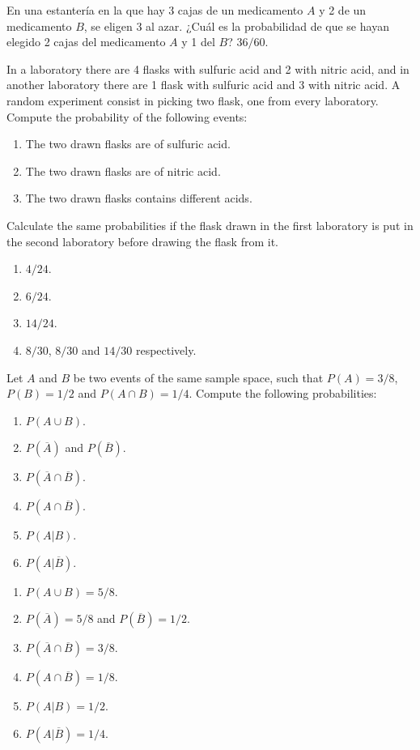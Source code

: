 
{En una estantería en la que hay 3 cajas de un medicamento $A$ y 2 de un medicamento $B$, se eligen 3 al azar.
¿Cuál es la probabilidad de que se hayan elegido 2 cajas del medicamento $A$ y 1 del $B$?
}
{$36/60$.}
{}


{In a laboratory there are 4 flasks with sulfuric acid and 2 with nitric acid, and in another laboratory there are 1 flask with sulfuric acid and 3 with nitric acid. 
A random experiment consist in picking two flask, one from every laboratory. 
Compute the probability of the following events:

\begin{enumerate}
\item The two drawn flasks are of sulfuric acid.
\item The two drawn flasks are of nitric acid.
\item The two drawn flasks contains different acids.
\end{enumerate}
Calculate the same probabilities if the flask drawn in the first laboratory is put in the second laboratory before drawing the flask from it. 
}
{
\begin{enumerate}
\item $4/24$.
\item $6/24$.
\item $14/24$.
\item $8/30$, $8/30$ and $14/30$ respectively. 
\end{enumerate}
}
{}


{Let $A$ and $B$ be two events of the same sample space, such that $P(A)=3/8$, $P(B)=1/2$ and $P(A\cap B)=1/4$.
Compute the following probabilities:

\begin{enumerate}
\item  $P(A\cup B)$.
\item  $P(\overline{A})$ and $P(\overline{B})$.
\item  $P(\overline{A}\cap \overline{B})$.
\item  $P(A\cap \overline{B})$.
\item  $P(A|B)$.
\item  $P(A|\overline{B})$.
\end{enumerate}
}
{
\begin{enumerate}
\item  $P(A\cup B)=5/8$.
\item  $P(\overline{A})=5/8$ and $P(\overline{B})=1/2$.
\item  $P(\overline{A}\cap \overline{B})=3/8$.
\item  $P(A\cap \overline{B})=1/8$.
\item  $P(A|B)=1/2$.
\item  $P(A|\overline{B})=1/4$.
\end{enumerate}
}
{}


